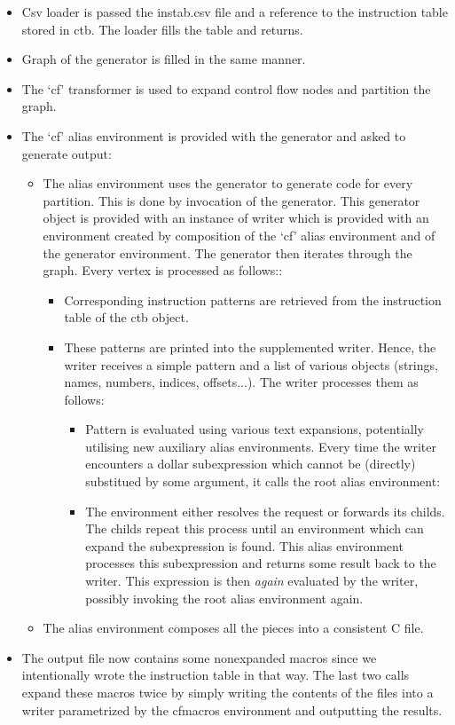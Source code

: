 \begin{itemize}
  \item Csv loader is passed the instab.csv file and a reference to the instruction table stored in ctb. The loader fills the table and returns.
  \item Graph of the generator is filled in the same manner.
  \item The `cf' transformer is used to expand control flow nodes and partition the graph.
  \item The `cf' alias environment is provided with the generator and asked to generate output:
  \begin{itemize}
    \item The alias environment uses the generator to generate code for every partition. This is done by invocation of the generator. This generator object is provided with an instance of writer which is provided with an environment created by composition of the `cf' alias environment and of the generator environment. The generator then iterates through the graph. Every vertex is processed as follows::
    \begin{itemize}
      \item Corresponding instruction patterns are retrieved from the instruction table of the ctb object.
      \item These patterns are printed into the supplemented writer. Hence, the writer receives a simple pattern and a list of various objects (strings, names, numbers, indices, offsets...). The writer processes them as follows:
        \begin{itemize}
          \item Pattern is evaluated using various text expansions, potentially utilising new auxiliary alias environments. Every time the writer encounters a dollar subexpression which cannot be (directly) substitued by some argument, it calls the root alias environment:
          \item The environment either resolves the request or forwards its childs. The childs repeat this process until an environment which can expand the subexpression is found. This alias environment processes this subexpression and returns some result back to the writer. This expression is then \emph{again} evaluated by the writer, possibly invoking the root alias environment again.
        \end{itemize}
    \end{itemize}
    \item The alias environment composes all the pieces into a consistent C file.
  \end{itemize}
  \item The output file now contains some nonexpanded macros since we intentionally wrote the instruction table in that way. The last two calls expand these macros twice by simply writing the contents of the files into a writer parametrized by the cfmacros environment and outputting the results.
\end{itemize}


